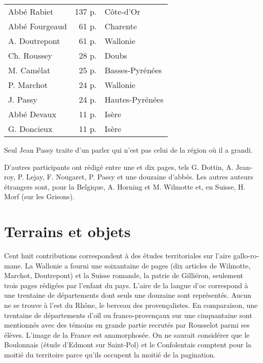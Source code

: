 \documentclass[french,output=paper,colorlinks,citecolor=brown]{../langscibook}
\begin{document}
\begin{otherlanguage}{french}
\begin{tabular}{lrl}
Abbé Rabiet  &   137 p.   &  Côte-d’Or \\
Abbé Fourgeaud  &   61 p.  &  Charente \\
A. Doutrepont  &     61 p.  &  Wallonie \\
Ch. Roussey   &   28 p.  &  Doubs \\
M. Camélat  &    25 p.  &  Basses-Pyrénées \\
P. Marchot  &    24 p.  &  Wallonie \\
J. Passy    &  24 p.  &  Hautes-Pyrénées \\
Abbé Devaux    &   11 p.  &  Isère  \\
G. Doncieux   &   11 p.  &  Isère \\
 \end{tabular}
 
Seul Jean Passy traite d’un parler qui n’est pas celui de la région où il a grandi.

D’autres participants ont rédigé entre une et dix pages, tels G. Dottin, A. Jeanroy, P. Lejay, F. Nougaret, P. Passy et une douzaine d’abbés. Les autres auteurs étrangers sont, pour la Belgique, A. Horning et M. Wilmotte et, en Suisse, H. Morf (sur les Grisons).

\section{Terrains et objets}
\largerpage
Cent huit contributions correspondent à des études territoriales sur l’aire gallo-romane. La Wallonie a fourni une soixantaine de pages (dix articles de Wilmotte, Marchot, Doutrepont) et la Suisse romande, la patrie de Gilliéron, seulement trois pages rédigées par l’enfant du pays. L’aire de la langue d’oc correspond à une trentaine de départements dont seuls une douzaine sont représentés. Aucun ne se trouve à l’est du Rhône, le berceau des provençalistes. En comparaison, une trentaine de départements d’oïl ou franco-provençaux sur une cinquantaine sont mentionnés avec des témoins en grande partie recrutés par Rousselot parmi ses élèves. L’image de la France est anamorphosée. On ne saurait considérer que le Boulonnais (étude d’Edmont sur Saint-Pol) et le Confolentais comptent pour la moitié du territoire parce qu’ils occupent la moitié de la pagination. 


\end{otherlanguage}
\end{document}
